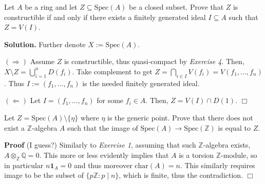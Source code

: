 \documentclass{template}
\newcommand{\qedwhite}{\hfill \ensuremath{\Box}}
\begin{document}
\begin{problem}[Exercise 5]
    Let $A$ be a ring and let $Z \subseteq \text{Spec}(A)$ be a closed subset.
    Prove that $Z$ is constructible if and only if there exists a finitely
    generated ideal $I \subseteq A$ such that $Z=V(I)$.
\end{problem}

\textbf{Solution.} Further denote $X := \text{Spec}(A)$.

$(\Rightarrow)$ Assume $Z$ is constructible, thus quasi-compact by
\textit{Exercise 4}. Then, $X \setminus Z = \bigcup_{i=1}^n D(f_i)$. Take
complement to get $Z = \bigcap_{i \in I}V(f_i) = V(f_1,\dots,f_n)$. Thus $I :=
(f_1,\dots,f_n)$ is the needed finitely generated ideal.

$(\Leftarrow)$ Let $I=(f_1,\dots,f_n)$ for some $f_i \in A$. Then, 
$Z = V(I) \cap D(1)$. \qedwhite

\begin{problem}[Exercise 6*]
    Let $Z = \text{Spec}(A) \setminus \{\eta\}$ where $\eta$ is the generic
    point. Prove that there does not exist a 
    $\mathbb{Z}$-algebra $A$ such that the image of $\text{Spec}(A) \to
    \text{Spec}(\mathbb{Z})$ is equal to $Z$.
\end{problem}

\textbf{Proof} (I guess?) Similarly to \textit{Exercise 1}, assuming that such
$\mathbb{Z}$-algebra exists, $A \otimes_{\mathbb{Z}} \mathbb{Q} = 0$. This more
or less evidently implies that $A$ is a torsion $\mathbb{Z}$-module, so in
particular $n\mathbf{1}_A=0$ and thus moreover $\text{char}(A)=n$. This
similarly requires image to be the subset of $\{p\mathbb{Z}: p \mid n\}$, which
is finite, thus the contradiction. \qedwhite
\end{document}
